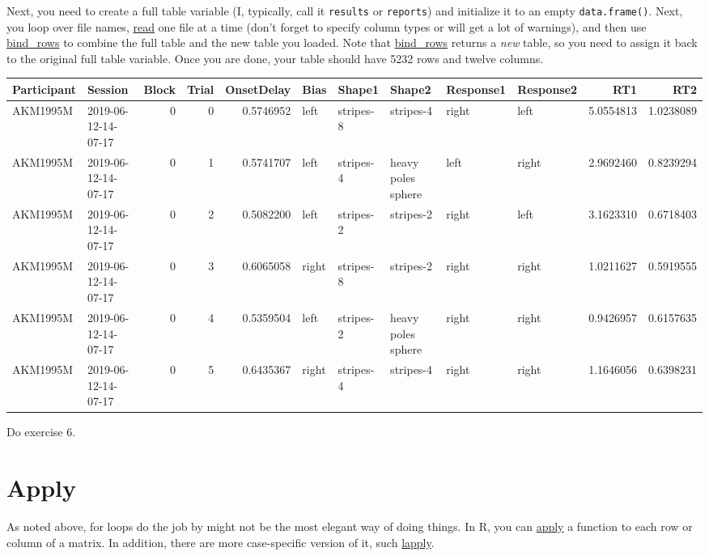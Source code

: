 \documentclass[
]{book}
\begin{document}
Next, you need to create a full table variable (I, typically, call it \texttt{results} or \texttt{reports}) and initialize it to an empty \texttt{data.frame()}. Next, you loop over file names, \protect\hyperlink{readr}{read} one file at a time (don't forget to specify column types or will get a lot of warnings), and then use \href{https://dplyr.tidyverse.org/reference/bind.html}{bind\_rows} to combine the full table and the new table you loaded. Note that \href{https://dplyr.tidyverse.org/reference/bind.html}{bind\_rows} returns a \emph{new} table, so you need to assign it back to the original full table variable. Once you are done, your table should have 5232 rows and twelve columns.

\begin{tabular}{l|l|r|r|r|l|l|l|l|l|r|r}
\hline
Participant & Session & Block & Trial & OnsetDelay & Bias & Shape1 & Shape2 & Response1 & Response2 & RT1 & RT2\\
\hline
AKM1995M & 2019-06-12-14-07-17 & 0 & 0 & 0.5746952 & left & stripes-8 & stripes-4 & right & left & 5.0554813 & 1.0238089\\
\hline
AKM1995M & 2019-06-12-14-07-17 & 0 & 1 & 0.5741707 & left & stripes-4 & heavy poles sphere & left & right & 2.9692460 & 0.8239294\\
\hline
AKM1995M & 2019-06-12-14-07-17 & 0 & 2 & 0.5082200 & left & stripes-2 & stripes-2 & right & left & 3.1623310 & 0.6718403\\
\hline
AKM1995M & 2019-06-12-14-07-17 & 0 & 3 & 0.6065058 & right & stripes-8 & stripes-2 & right & right & 1.0211627 & 0.5919555\\
\hline
AKM1995M & 2019-06-12-14-07-17 & 0 & 4 & 0.5359504 & left & stripes-2 & heavy poles sphere & right & right & 0.9426957 & 0.6157635\\
\hline
AKM1995M & 2019-06-12-14-07-17 & 0 & 5 & 0.6435367 & right & stripes-4 & stripes-4 & right & right & 1.1646056 & 0.6398231\\
\hline
\end{tabular}

Do exercise 6.

\hypertarget{apply}{%
\section{Apply}\label{apply}}

As noted above, for loops do the job by might not be the most elegant way of doing things. In R, you can \href{https://stat.ethz.ch/R-manual/R-devel/library/base/html/apply.html}{apply} a function to each row or column of a matrix. In addition, there are more case-specific version of it, such \href{https://stat.ethz.ch/R-manual/R-devel/library/base/html/lapply.html}{lapply}.
\end{document}
